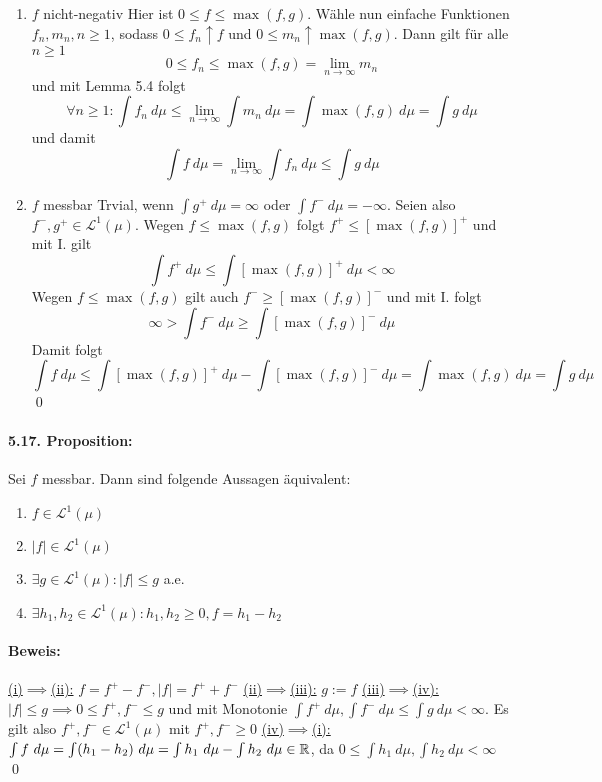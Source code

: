 \begin{enumerate}[label=(\roman*)]
     \begin{enumerate}[label=\Roman*.]
        \item $f$ nicht-negativ\newline
        Hier ist $0\leq f\leq \max(f,g)$. W\"ahle nun einfache Funktionen $f_n,m_n,n\geq1$, sodass $0\leq f_n\uparrow f$ und $0\leq m_n\uparrow\max(f,g)$. Dann gilt f\"ur alle $n\geq1$
        $$0\leq f_n\leq \max(f,g)=\lim_{n\to\infty}m_n$$
        und mit Lemma 5.4 folgt 
        $$\forall n\geq 1:\int f_n\ d\mu\leq\lim_{n\to\infty}\int m_n\ d\mu=\int \max(f,g)\ d\mu=\int g\ d\mu$$
        und damit
        $$\int f\ d\mu=\lim_{n\to\infty}\int f_n\ d\mu\leq\int g\ d\mu$$
        \item $f$ messbar\newline
        Trvial, wenn $\int g^+\ d\mu=\infty$ oder $\int f^-\ d\mu=-\infty$. Seien also $f^-,g^+\in\mathcal{L}^1(\mu)$. Wegen $f\leq\max(f,g)$ folgt $f^+\leq[\max(f,g)]^+$ und mit I. gilt 
        $$\int f^+\ d\mu\leq \int [\max(f,g)]^+\ d\mu<\infty$$
        Wegen $f\leq\max(f,g)$ gilt auch $f^-\geq[\max(f,g)]^-$ und mit I. folgt
        $$\infty>\int f^-\ d\mu\geq\int [\max(f,g)]^-\ d\mu$$
        Damit folgt 
        $$\int f\ d\mu\leq\int [\max(f,g)]^+\ d\mu-\int [\max(f,g)]^-\ d\mu=\int \max(f,g)\ d\mu=\int g\ d\mu$$
        \qed
     \end{enumerate}
 \end{enumerate}
 
 \paragraph{5.17. Proposition:}Sei $f$ messbar. Dann sind folgende Aussagen \"aquivalent:
 \begin{enumerate}[label=(\roman*)]
     \item $f\in\mathcal{L}^1(\mu)$
     \item $|f|\in\mathcal{L}^1(\mu)$
     \item $\exists g\in\mathcal{L}^1(\mu):|f|\leq g$ a.e.
     \item $\exists h_1,h_2\in\mathcal{L}^1(\mu):h_1,h_2\geq0,f=h_1-h_2$
 \end{enumerate}
 
 \paragraph{Beweis:}
 \underline{(i)$\implies$(ii):} $f=f^+-f^-,|f|=f^++f^-$\newline
 \underline{(ii)$\implies$(iii):} $g:=f$ \newline
 \underline{(iii)$\implies$(iv):} $|f|\leq g\implies 0\leq f^+,f^-\leq g$ und mit Monotonie $\int f^+\ d\mu,\int f^-\ d\mu\leq \int g\ d\mu<\infty$. Es gilt also $f^+,f^-\in\mathcal{L}^1(\mu)$ mit $f^+,f^-\geq0$ \newline
 \underline{(iv)$\implies$(i):} $\int f\ d\mu=\int (h_1-h_2)\ d\mu=\int h_1\ d\mu-\int h_2\ d\mu\in\R$, da $0\leq\int h_1\ d\mu,\int h_2\ d\mu<\infty$ \qed
 
